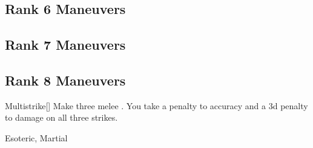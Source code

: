 \subsection{Rank 6 Maneuvers}
\subsection{Rank 7 Maneuvers}
\subsection{Rank 8 Maneuvers}

\lowercase{\hypertarget{maneuver:Multistrike}{}}\label{maneuver:Multistrike}
\hypertarget{maneuver:Multistrike}{}
\begin{freeability}[Rank 8]{Multistrike}[]
Make three melee .
You take a  penalty to accuracy and a \minus3d penalty to damage on all three strikes.


 Esoteric, Martial
\end{freeability}
\vspace{0.25em}

